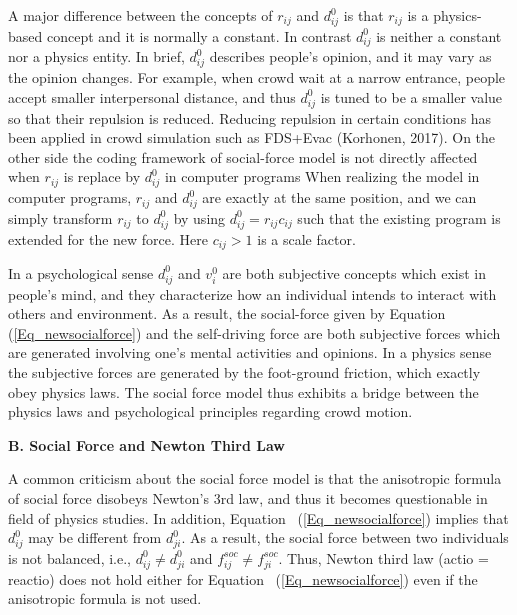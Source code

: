 \documentclass{article}
\begin{document}
A major difference between the concepts of $r_{ij}$ and $d_{ij}^0$ is that $r_{ij}$ is a physics-based concept and it is normally a constant. In contrast $d_{ij}^0$ is neither a constant nor a physics entity. In brief, $d_{ij}^0$ describes people's opinion, and it may vary as the opinion changes. For example, when crowd wait at a narrow entrance, people accept smaller interpersonal distance, and thus $d_{ij}^0$ is tuned to be a smaller value so that their repulsion is reduced. Reducing repulsion in certain conditions has been applied in
crowd simulation such as FDS+Evac (Korhonen, 2017). On the other side the coding framework of social-force model is not directly affected when $r_{ij}$ is replace by $d_{ij}^0$ in computer programs When realizing the model in computer programs, $r_{ij}$ and $d_{ij}^0$ are exactly at the same position, and we can simply transform $r_{ij}$ to $d_{ij}^0$ by using $d_{ij}^0 = r_{ij} c_{ij}$ such that the existing program is extended for the new force. Here $c_{ij}>1$ is a scale factor.

In a psychological sense $d_{ij}^0$ and $v_i^0$ are both subjective concepts which exist in people's mind, and they characterize how an individual intends to interact with others and environment.  As a result, the social-force given by Equation ~ (\ref{Eq_newsocialforce}) and the self-driving force are both subjective forces which are generated involving one's mental activities and opinions. In a physics sense the subjective forces are generated by the foot-ground friction, which exactly obey physics laws. The social force model thus exhibits a bridge between the physics laws and psychological principles regarding crowd motion.


\noindent \textbf{B. Social Force and Newton Third Law}

A common criticism about the social force model is that the anisotropic formula of social force disobeys Newton's 3rd law, and thus it becomes questionable in field of physics studies.  In addition, Equation ~(\ref{Eq_newsocialforce}) implies that $d_{ij}^0$ may be different from $d_{ji}^0$.  As a result, the social force between two individuals is not balanced, i.e.,  $d_{ij}^0 \neq d_{ji}^0$ and $f_{ij}^{soc} \neq f_{ji}^{soc}$.  Thus, Newton third law (actio = reactio) does not hold either for Equation ~(\ref{Eq_newsocialforce}) even if the anisotropic formula is not used.
\end{document}
